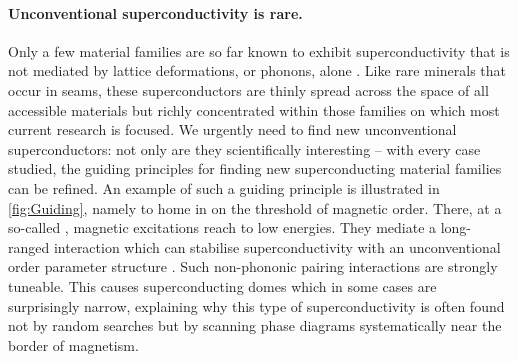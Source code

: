 \paragraph{Unconventional superconductivity is
rare.} Only a few material families are so far known to exhibit superconductivity
that is not mediated by lattice deformations, or phonons, alone \cite{monthoux07,norman11}. Like rare minerals that occur in seams, these superconductors are thinly spread across the space of all accessible materials but richly concentrated within those families on which most current research is focused.
We urgently need to find new unconventional superconductors: 
not only are they scientifically interesting -- with every case  studied, the guiding principles for finding new superconducting material families can be refined.
An example of such a guiding principle is illustrated in \autoref{fig:Guiding}, namely to home in on the threshold of magnetic order. There, at a so-called  , magnetic excitations reach to low energies. They mediate a long-ranged interaction which can stabilise superconductivity with an unconventional order parameter structure %
\cite{monthoux07}. Such non-phononic pairing interactions are strongly tuneable. This causes superconducting domes 
which in some cases are surprisingly narrow, explaining why this type of superconductivity is often found not by random searches but by scanning phase diagrams systematically near the border of magnetism. %


